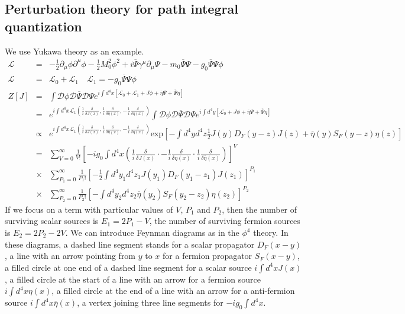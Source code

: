 \documentclass[cyan]{elegantnote}
\begin{document}
\subsection{Perturbation theory for path integral quantization}
\noindent
We use Yukawa theory as an example.
\begin{eqnarray}
\mathcal{L} &=& -\frac{1}{2}\partial_{\mu} \phi \partial^{\mu} \phi -\frac{1}{2}M_0^2 \phi^2 + i\overline{\Psi} \gamma^{\mu} \partial_{\mu} \Psi - m_0\overline{\Psi}\Psi -g_0 \overline{\Psi}\Psi\phi \nonumber \\
\mathcal{L} &=& \mathcal{L}_0 + \mathcal{L}_1 \quad \mathcal{L}_1 =- g_0\overline{\Psi}\Psi\phi \nonumber \\
Z[J] &=& \int \mathcal{D}\phi \mathcal{D}\overline{\Psi} \mathcal{D}\Psi e^{i\int d^4x [\mathcal{L}_0 + \mathcal{L}_1 + J\phi + \overline{\eta}\Psi +  \overline{\Psi}\eta]} \nonumber \\
&=& e^{i\int d^4x \mathcal{L}_1(\frac{1}{i} \frac{\delta}{\delta J(x)},\frac{1}{i}\frac{\delta}{\delta \overline{\eta}(x)},-\frac{1}{i}\frac{\delta}{\delta \eta(x)})} \int \mathcal{D}\phi \mathcal{D}\overline{\Psi} \mathcal{D}\Psi e^{i\int d^4y [\mathcal{L}_0 + J\phi + \overline{\eta}\Psi +  \overline{\Psi}\eta]} \nonumber \\
&\propto & e^{i\int d^4x \mathcal{L}_1(\frac{1}{i} \frac{\delta}{\delta J(x)},\frac{1}{i}\frac{\delta}{\delta \overline{\eta}(x)},-\frac{1}{i}\frac{\delta}{\delta \eta(x)})} \mathrm{exp} [- \int d^4y d^4z  \frac{1}{2} J(y)D_F(y-z)J(z) + \overline{\eta}(y)S_F(y-z)\eta(z)] \nonumber \\
& =& \sum_{V=0}^{\infty} \frac{1}{V!} [-ig_0 \int d^4x (\frac{1}{i} \frac{\delta}{\delta J(x)}  \cdot -\frac{1}{i}\frac{\delta}{\delta \eta(x)} \cdot \frac{1}{i}\frac{\delta}{\delta \overline{\eta}(x)})]^V \nonumber \\
&\times & \sum_{P_1=0}^{\infty} \frac{1}{P_1!} [-\frac{1}{2} \int d^4y_1 d^4z_1 J(y_1)D_F(y_1-z_1)J(z_1)]^{P_1} \nonumber \\
&\times &  \sum_{P_2=0}^{\infty} \frac{1}{P_2!} [-\int d^4y_2 d^4z_2 \overline{\eta}(y_2)S_F(y_2-z_2)\eta(z_2)]^{P_2} \nonumber
\end{eqnarray}
If we focus on a term with particular values of $V$, $P_1$ and $P_2$, then the number of surviving scalar sources is $E_1 = 2P_1-V$, the number of surviving fermion sources is $E_2 = 2P_2-2V$.
We can introduce Feynman diagrams as in the $\phi^4$ theory. In these diagrams, a dashed line segment stands for a scalar propagator $D_F(x-y)$, a line with an arrow pointing from $y$ to $x$ for a fermion propagator $S_F(x-y)$, a filled circle at one end of a dashed line segment for a scalar source $i\int d^4x J(x)$, a filled circle at the start of a line with an arrow for a fermion source $i\int d^4x \eta(x)$, a filled circle at the end of a line with an arrow for a anti-fermion source $i\int d^4x \overline{\eta}(x)$, a vertex joining three line segments for $-ig_0\int d^4x$.
\end{document}
